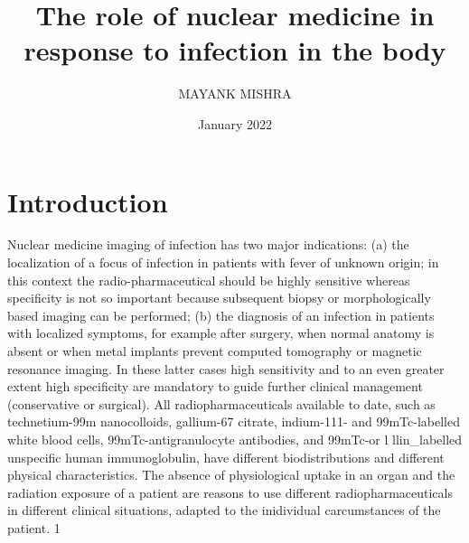 \documentclass{article}
\title{The role of nuclear medicine in response to infection in the body}
\author{MAYANK MISHRA }
\date{January 2022}
\begin{document}
\maketitle

\section{Introduction}
Nuclear medicine imaging of infection has two major indications: (a) the localization of a focus
of infection in patients with fever of unknown origin; in this context the radio-pharmaceutical
should be highly sensitive whereas specificity is not so important because subsequent biopsy or
morphologically based imaging can be performed; (b) the diagnosis of an infection in patients
with localized symptoms, for example after surgery, when normal anatomy is absent or when
metal implants prevent computed tomography or magnetic resonance imaging. In these latter
cases high sensitivity and to an even greater extent high specificity are mandatory to guide
further clinical management (conservative or surgical). All radiopharmaceuticals available to
date, such as technetium-99m nanocolloids, gallium-67 citrate, indium-111- and 99mTc-labelled
white blood cells, 99mTc-antigranulocyte antibodies, and 99mTc-or l llin_labelled unspecific
human immunoglobulin, have different biodistributions and different physical characteristics.
The absence of physiological uptake in an organ and the radiation exposure of a patient are
reasons to use different radiopharmaceuticals in different clinical situations, adapted to the
inidividual carcumstances of the patient.
1
\end{document}
